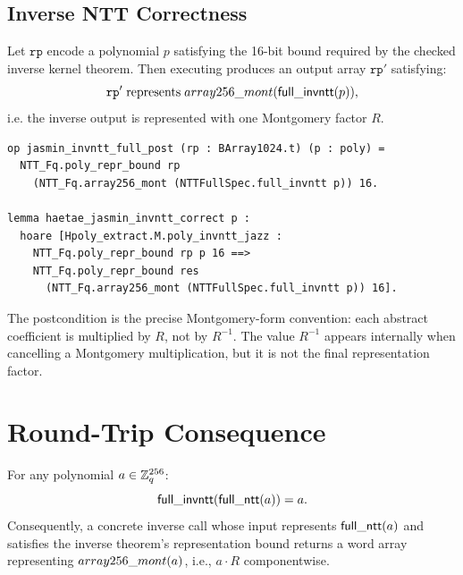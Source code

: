 \subsection{Inverse NTT Correctness}

\begin{theorem}
  \label{thm:main_invntt}
  Let $\texttt{rp}$ encode a polynomial \(p\) satisfying the 16-bit bound
  required by the checked inverse kernel theorem.
  Then executing  produces an output
  array $\texttt{rp}'$ satisfying:
  \[
    \texttt{rp}' \;\text{represents}\;
      array256\_mont(\mathsf{full\_invntt}(p)),
  \]
  i.e. the inverse output is represented with one Montgomery factor \(R\).
\end{theorem}

\begin{lstlisting}[language=EasyCrypt,
  caption={End-to-end inverse NTT correctness statement},
  label={lst:e2e_invntt}]
op jasmin_invntt_full_post (rp : BArray1024.t) (p : poly) =
  NTT_Fq.poly_repr_bound rp
    (NTT_Fq.array256_mont (NTTFullSpec.full_invntt p)) 16.

lemma haetae_jasmin_invntt_correct p :
  hoare [Hpoly_extract.M.poly_invntt_jazz :
    NTT_Fq.poly_repr_bound rp p 16 ==>
    NTT_Fq.poly_repr_bound res
      (NTT_Fq.array256_mont (NTTFullSpec.full_invntt p)) 16].
\end{lstlisting}

The  postcondition is the precise Montgomery-form
convention: each abstract coefficient is multiplied by \(R\), not by
\(R^{-1}\).  The value \(R^{-1}\) appears internally when cancelling a
Montgomery multiplication, but it is not the final representation factor.

\section{Round-Trip Consequence}

\begin{proposition}
  \label{thm:roundtrip}
  For any polynomial $a \in \mathbb{Z}_q^{256}$:
  \[
    \mathsf{full\_invntt}(\mathsf{full\_ntt}(a)) = a.
  \]
Consequently, a concrete inverse call whose input represents
\(\mathsf{full\_ntt}(a)\) and satisfies the inverse theorem's representation
bound returns a word array representing \(array256\_mont(a)\), i.e.,
\(a\cdot R\) componentwise.
\end{proposition}

